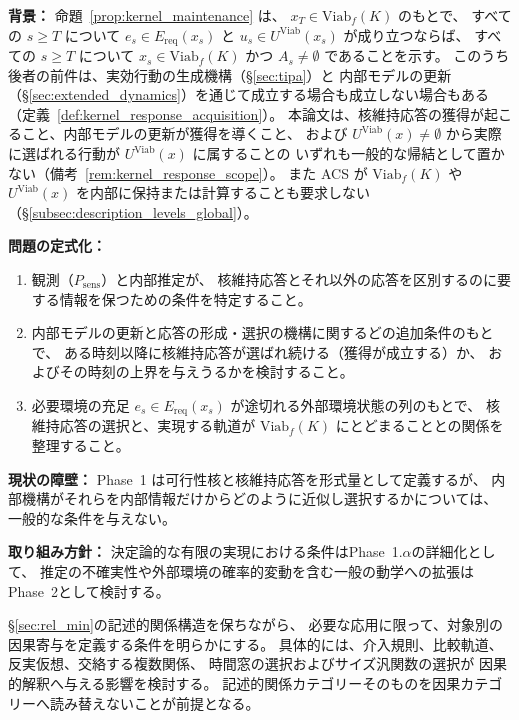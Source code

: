 \begin{problem}[核維持応答の獲得条件]
\label{prob:kernel_response_acquisition_conditions}
\textbf{背景：}
命題~\ref{prop:kernel_maintenance} は、
$x_T\in\mathrm{Viab}_f(K)$ のもとで、
すべての $s\ge T$ について $e_s\in E_{\mathrm{req}}(x_s)$ と
$u_s\in U^{\mathrm{Viab}}(x_s)$ が成り立つならば、
すべての $s\ge T$ について $x_s\in\mathrm{Viab}_f(K)$ かつ $A_s\neq\emptyset$ であることを示す。
このうち後者の前件は、実効行動の生成機構（\S\ref{sec:tipa}）と
内部モデルの更新（\S\ref{sec:extended_dynamics}）を通じて成立する場合も成立しない場合もある
（定義~\ref{def:kernel_response_acquisition}）。
本論文は、核維持応答の獲得が起こること、内部モデルの更新が獲得を導くこと、
および $U^{\mathrm{Viab}}(x)\neq\emptyset$ から実際に選ばれる行動が $U^{\mathrm{Viab}}(x)$ に属することの
いずれも一般的な帰結として置かない（備考~\ref{rem:kernel_response_scope}）。
また ACS が $\mathrm{Viab}_f(K)$ や $U^{\mathrm{Viab}}(x)$ を内部に保持または計算することも要求しない
（\S\ref{subsec:description_levels_global}）。

\textbf{問題の定式化：}
\begin{enumerate}
  \item[(i)] 観測（$P_{\mathrm{sens}}$）と内部推定が、
  核維持応答とそれ以外の応答を区別するのに要する情報を保つための条件を特定すること。
  \item[(ii)] 内部モデルの更新と応答の形成・選択の機構に関するどの追加条件のもとで、
  ある時刻以降に核維持応答が選ばれ続ける（獲得が成立する）か、
  およびその時刻の上界を与えうるかを検討すること。
  \item[(iii)] 必要環境の充足 $e_s\in E_{\mathrm{req}}(x_s)$ が途切れる外部環境状態の列のもとで、
  核維持応答の選択と、実現する軌道が $\mathrm{Viab}_f(K)$ にとどまることとの関係を整理すること。
\end{enumerate}

\textbf{現状の障壁：}
Phase~1 は可行性核と核維持応答を形式量として定義するが、
内部機構がそれらを内部情報だけからどのように近似し選択するかについては、
一般的な条件を与えない。

\textbf{取り組み方針：}
決定論的な有限の実現における条件はPhase~1.$\alpha$の詳細化として、
推定の不確実性や外部環境の確率的変動を含む一般の動学への拡張はPhase~2として検討する。
\end{problem}

\begin{problem}[関係記述から因果モデルへの拡張]
\label{prob:relational_causality}
\S\ref{sec:rel_min}の記述的関係構造を保ちながら、
必要な応用に限って、対象別の因果寄与を定義する条件を明らかにする。
具体的には、介入規則、比較軌道、反実仮想、交絡する複数関係、
時間窓の選択およびサイズ汎関数の選択が
因果的解釈へ与える影響を検討する。
記述的関係カテゴリーそのものを因果カテゴリーへ読み替えないことが前提となる。
\end{problem}

